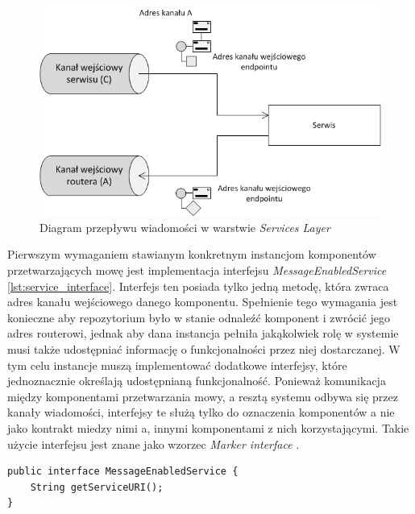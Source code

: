 \begin{figure}[!h]
	\centering
	\includegraphics[scale=0.85]{services_layer_flow.png}
	\caption{Diagram przepływu wiadomości w warstwie \textit{Services Layer}}\label{fig:services_layer_project}
\end{figure}

Pierwszym wymaganiem stawianym konkretnym instancjom komponentów przetwarzających mowę jest implementacja interfejsu \textit{MessageEnabledService} \ref{lst:service_interface}. Interfejs ten posiada tylko jedną metodę, która zwraca adres kanału wejściowego danego komponentu. Spełnienie tego wymagania jest konieczne aby repozytorium było w stanie odnaleźć komponent i zwrócić jego adres routerowi, jednak aby dana instancja pełniła jakąkolwiek rolę w systemie musi także udostępniać informację o funkcjonalności przez niej dostarczanej. W tym celu instancje muszą implementować dodatkowe interfejsy, które jednoznacznie określają udostępnianą funkcjonalność. Ponieważ komunikacja między komponentami przetwarzania mowy, a resztą systemu odbywa się przez kanały wiadomości, interfejsy te służą tylko do oznaczenia komponentów a nie jako kontrakt miedzy nimi a, innymi komponentami z nich korzystającymi. Takie użycie interfejsu jest znane jako wzorzec \textit{Marker interface} \cite{bloch2008}.

\lstset{language=Java, tabsize=4, caption=Definicja interfejsu MessageEnabledService w języku Java.,label=lst:service_interface}

\begin{center}
\begin{lstlisting}
public interface MessageEnabledService {
	String getServiceURI();
}
\end{lstlisting}
\end{center}


